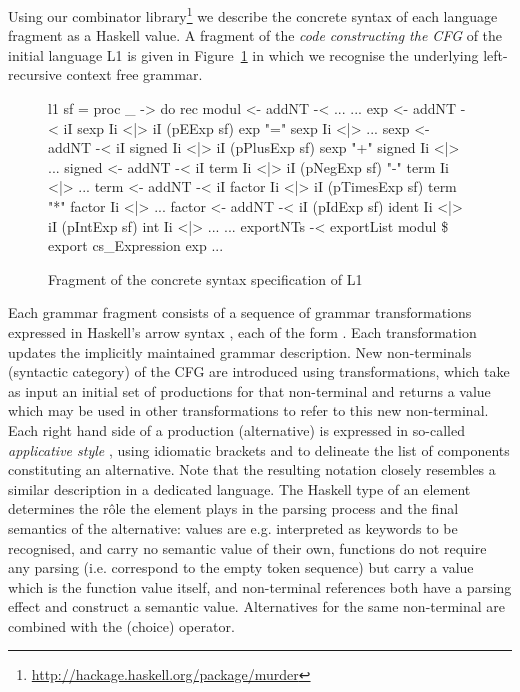 Using our combinator library\footnote{\url{http://hackage.haskell.org/package/murder}} \cite{VSD12} we describe  the concrete syntax of each language fragment as a Haskell value.
A fragment of the {\em code constructing the CFG} of the initial language L1 is given in Figure~\ref{fig:gram} in which we recognise the underlying left-recursive context free grammar.
\begin{figure}[th]
\begin{center}
\begin{haskell}
l1 sf = proc _ -> do
   rec modul  <- addNT -< ...
       ...
       exp    <- addNT -< iI sexp   Ii <|> 
                          iI (pEExp     sf) exp  "=" sexp   Ii <|> ...
       sexp   <- addNT -< iI signed Ii <|> 
                          iI (pPlusExp  sf) sexp "+" signed Ii <|> ...
       signed <- addNT -< iI term   Ii <|> 
                          iI (pNegExp   sf) "-" term Ii <|> ... 
       term   <- addNT -< iI factor Ii <|> 
                          iI (pTimesExp sf) term "*" factor Ii <|> ...
       factor <- addNT -< iI (pIdExp    sf) ident Ii <|>  
                          iI (pIntExp   sf) int   Ii <|> ...
       ...
   exportNTs -< exportList modul \$ export cs_Expression exp ...
\end{haskell}
\vspace{-15pt}
\caption{Fragment of the concrete syntax specification of L1}
\label{fig:gram}
\end{center}
\end{figure}
Each grammar fragment consists of a sequence of grammar transformations expressed in Haskell's arrow syntax \cite{507664}, each of the form . Each transformation updates the implicitly maintained grammar description.
New non-terminals (syntactic category) of the CFG are introduced using   transformations, which take as input an initial set of productions for that non-terminal and returns a value which may be used in other transformations to refer to this new non-terminal.  Each right hand side of a production (alternative) is expressed in so-called \emph{applicative style} \cite{McB07},
using idiomatic brackets  and  to delineate the list of components constituting an alternative. Note that the resulting notation closely resembles a similar description in a dedicated language.  The Haskell type of an element determines the r\^ole the element plays in the parsing process and the final semantics of the alternative:  values are e.g. interpreted as keywords to be recognised, and carry no semantic value of their own, functions do not require any parsing (i.e. correspond to the empty token sequence) but carry a value which is the function value itself, and non-terminal references both have a parsing effect  and construct a semantic value.
Alternatives for the same non-terminal are combined with the \texthaskell{<|>} (choice) operator.

